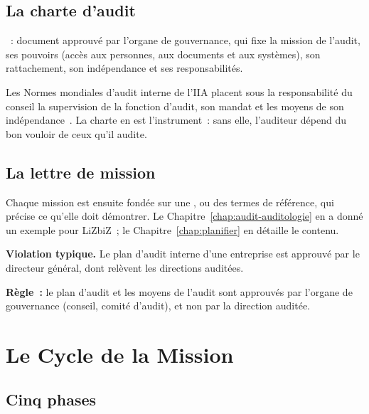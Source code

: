 \subsection{La charte d'audit}

\begin{boxdef}
~: document approuvé par
l'organe de gouvernance, qui fixe la mission de l'audit, ses pouvoirs (accès
aux personnes, aux documents et aux systèmes), son rattachement, son
indépendance et ses responsabilités.
\end{boxdef}

Les Normes mondiales d'audit interne de l'IIA placent sous la
responsabilité du conseil la supervision de la fonction d'audit, son mandat
et les moyens de son indépendance~\cite{iia2024gias}. La charte en est
l'instrument~: sans elle, l'auditeur dépend du bon vouloir de ceux qu'il
audite.

\subsection{La lettre de mission}

Chaque mission est ensuite fondée sur une , ou des termes de référence, qui précise
ce qu'elle doit démontrer. Le Chapitre~\ref{chap:audit-auditologie} en a
donné un exemple pour LiZbiZ~; le Chapitre~\ref{chap:planifier} en détaille
le contenu.

\begin{boxalert}
\textbf{Violation typique.} Le plan d'audit interne d'une entreprise est
approuvé par le directeur général, dont relèvent les directions auditées.

\smallskip
\textbf{Règle~:} le plan d'audit et les moyens de l'audit sont approuvés par
l'organe de gouvernance (conseil, comité d'audit), et non par la direction
auditée.
\end{boxalert}

\section{Le Cycle de la Mission}
\label{sec:c05-cycle}

\subsection{Cinq phases}

